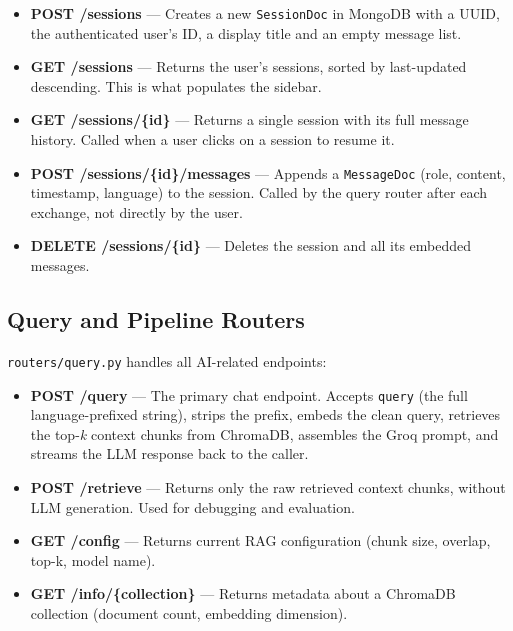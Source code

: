 \begin{itemize}
  \item \textbf{POST /sessions} --- Creates a new \texttt{SessionDoc} in MongoDB with a
        UUID, the authenticated user's ID, a display title and an empty message list.

  \item \textbf{GET /sessions} --- Returns the user's sessions, sorted by last-updated
        descending. This is what populates the sidebar.

  \item \textbf{GET /sessions/\{id\}} --- Returns a single session with its full message
        history. Called when a user clicks on a session to resume it.

  \item \textbf{POST /sessions/\{id\}/messages} --- Appends a \texttt{MessageDoc} (role,
        content, timestamp, language) to the session. Called by the query router after
        each exchange, not directly by the user.

  \item \textbf{DELETE /sessions/\{id\}} --- Deletes the session and all its embedded
        messages.
\end{itemize}

\subsection{Query and Pipeline Routers}
\label{sec:query-router}
\label{sec:pipeline-router}

\texttt{routers/query.py} handles all AI-related endpoints:

\begin{itemize}
  \item \textbf{POST /query} — The primary chat endpoint. Accepts \texttt{query} (the
        full language-prefixed string), strips the prefix, embeds the clean query,
        retrieves the top-\textit{k} context chunks from ChromaDB, assembles the Groq
        prompt, and streams the LLM response back to the caller.

  \item \textbf{POST /retrieve} — Returns only the raw retrieved context chunks, without
        LLM generation. Used for debugging and evaluation.

  \item \textbf{GET /config} — Returns current RAG configuration (chunk size, overlap,
        top-k, model name).

  \item \textbf{GET /info/\{collection\}} — Returns metadata about a ChromaDB collection
        (document count, embedding dimension).
\end{itemize}

